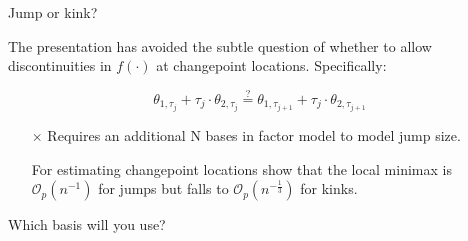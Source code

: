 \documentclass{beamer}
\begin{document}



\begin{frame}{Jump or kink?}

The presentation has avoided the subtle question of whether to allow discontinuities in $f(\cdot)$ at changepoint locations. Specifically: 

\begin{equation*}
	\theta_{1,\tau_j} + \tau_j \cdot \theta_{2,\tau_j} \overset{?}{=} \theta_{1,\tau_{j+1}} + \tau_j \cdot \theta_{2,\tau_{j+1}}
\end{equation*}

\bigskip

\begin{itemize}
	\item[$\times$] Requires an additional N bases in factor model to model jump size. 
	\item[\checkmark] For estimating changepoint locations \cite{chen2020jump} show that the local minimax is $\mathcal{O}_p(n^{-1})$ for jumps but falls to $\mathcal{O}_p(n^{-\frac{1}{3}})$ for kinks. 
\end{itemize}

\end{frame}




\begin{frame}{Which basis will you use?}

\end{frame}



\end{document}
